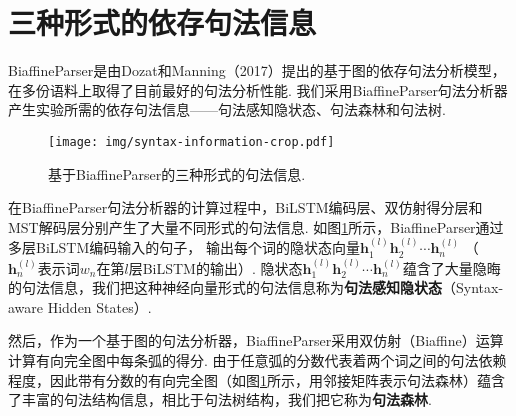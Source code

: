 %

\section{三种形式的依存句法信息}
BiaffineParser是由Dozat和Manning（2017）提出的基于图的依存句法分析模型，在多份语料上取得了目前最好的句法分析性能.
我们采用BiaffineParser句法分析器产生实验所需的依存句法信息——句法感知隐状态、句法森林和句法树.

\begin{figure}[hb]
    \centering
    \texttt{[image: img/syntax-information-crop.pdf]}
    \caption{基于BiaffineParser的三种形式的句法信息. }
    \label{fig:syntax-information}
\end{figure}

在BiaffineParser句法分析器的计算过程中，BiLSTM编码层、双仿射得分层和MST解码层分别产生了大量不同形式的句法信息.
如图\ref{fig:syntax-information}所示，BiaffineParser通过多层BiLSTM编码输入的句子，
输出每个词的隐状态向量$\mathbf{h}_1^{(l)}\mathbf{h}_2^{(l)}\cdots \mathbf{h}_n^{(l)}$ （ $\mathbf{h}_n^{(l)}$表示词$w_n$在第$l$层BiLSTM的输出）.  隐状态$\mathbf{h}_1^{(l)}\mathbf{h}_2^{(l)} \cdots \mathbf{h}_n^{(l)}$蕴含了大量隐晦的句法信息，我们把这种神经向量形式的句法信息称为\textbf{句法感知隐状态}（Syntax-aware Hidden States）.

然后，作为一个基于图的句法分析器，BiaffineParser采用双仿射（Biaffine）运算计算有向完全图中每条弧的得分. 由于任意弧的分数代表着两个词之间的句法依赖程度，因此带有分数的有向完全图（如图\ref{fig:syntax-information}所示，用邻接矩阵表示句法森林）蕴含了丰富的句法结构信息，相比于句法树结构，我们把它称为\textbf{句法森林}.

